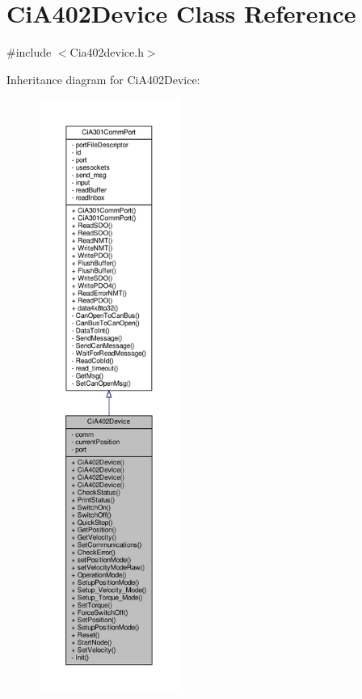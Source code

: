 \hypertarget{classCiA402Device}{}\section{Ci\+A402\+Device Class Reference}
\label{classCiA402Device}


{\ttfamily \#include $<$Cia402device.\+h$>$}



Inheritance diagram for Ci\+A402\+Device\+:
\nopagebreak
\begin{figure}[H]
\begin{center}
\leavevmode
\includegraphics[height=550pt]{classCiA402Device__inherit__graph}
\end{center}
\end{figure}


